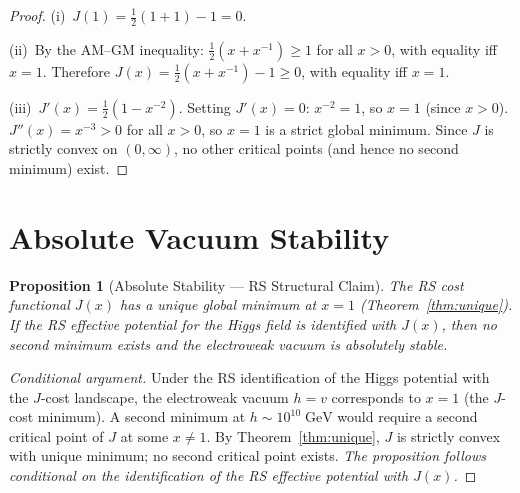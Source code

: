 \documentclass[12pt,a4paper]{article}
\newtheorem{proposition}[theorem]{Proposition}
\theoremstyle{definition}
\theoremstyle{remark}
\begin{document}
\begin{proof}
(i)~$J(1) = \tfrac{1}{2}(1 + 1) - 1 = 0$.

(ii)~By the AM--GM inequality: $\tfrac{1}{2}(x + x^{-1}) \geq 1$
for all $x > 0$, with equality iff $x = 1$.  Therefore
$J(x) = \tfrac{1}{2}(x + x^{-1}) - 1 \geq 0$, with equality iff
$x = 1$.

(iii)~$J'(x) = \tfrac{1}{2}(1 - x^{-2})$.  Setting $J'(x) = 0$:
$x^{-2} = 1$, so $x = 1$ (since $x > 0$).
$J''(x) = x^{-3} > 0$ for all $x > 0$, so $x = 1$ is a strict
global minimum.  Since $J$ is strictly convex on $(0, \infty)$,
no other critical points (and hence no second minimum) exist.
\end{proof}

\section{Absolute Vacuum Stability}
\label{sec:stability}

\begin{proposition}[Absolute Stability --- RS Structural Claim]
\label{thm:stable}
The RS cost functional $J(x)$ has a unique global minimum at $x = 1$
(Theorem~\ref{thm:unique}).  If the RS effective potential for the
Higgs field is identified with $J(x)$, then no second minimum exists
and the electroweak vacuum is absolutely stable.
\end{proposition}

\begin{proof}[Conditional argument]
Under the RS identification of the Higgs potential with the
$J$-cost landscape, the electroweak vacuum $h = v$ corresponds
to $x = 1$ (the $J$-cost minimum).  A second minimum at
$h \sim 10^{10}\;\mathrm{GeV}$ would require a second critical
point of $J$ at some $x \neq 1$.  By Theorem~\ref{thm:unique},
$J$ is strictly convex with unique minimum; no second critical
point exists.  \emph{The proposition follows conditional on the
identification of the RS effective potential with $J(x)$.}
\end{proof}
\end{document}
